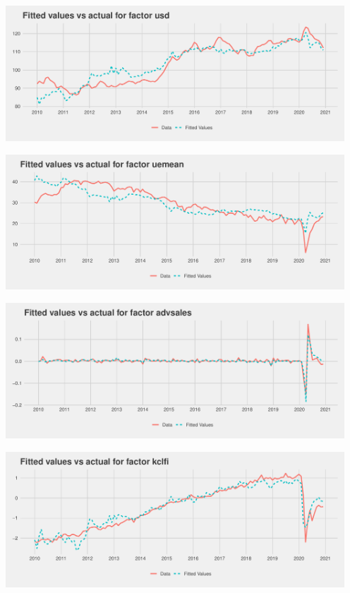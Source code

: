 \documentclass[11pt, letterpaper]{article}\usepackage[]{graphicx}\usepackage[]{color}
\begin{document}
{\centering \includegraphics[width=5in,height=2in]{figure/unnamed-chunk-20-19} 

}




{\centering \includegraphics[width=5in,height=2in]{figure/unnamed-chunk-20-20} 

}




{\centering \includegraphics[width=5in,height=2in]{figure/unnamed-chunk-20-21} 

}




{\centering \includegraphics[width=5in,height=2in]{figure/unnamed-chunk-20-22} 

}
\end{document}
